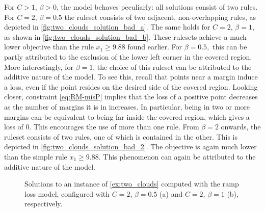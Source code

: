 \begin{example}
    For $C > 1$, $\beta > 0$, the model behaves peculiarly: all solutions consist of two rules.
    For $C=2$, $\beta = 0.5$ the ruleset consists of two adjacent, non-overlapping rules, as depicted in \autoref{fig:two_clouds_solution_bad_a}.
    The same holds for $C=2$, $\beta=1$, as shown in \autoref{fig:two_clouds_solution_bad_b}.
    These rulesets achieve a much lower objective than the rule $x_1 \geq 9.88$ found earlier.
    For $\beta=0.5,$ this can be partly attributed to the exclusion of the lower left corner in the covered region.
    More interestingly, for $\beta=1$, the choice of this ruleset can be attributed to the additive nature of the model.
    To see this, recall that points near a margin induce a loss, even if the point resides on the desired side of the covered region.
    Looking closer, constraint \eqref{eq:RM-misP} implies that the loss of a positive point decreases as the number of margins it is in increases.
    In particular, being in two or more margins can be equivalent to being far inside the covered region, which gives a loss of $0$.
    This encourages the use of more than one rule.
    From $\beta=2$ onwards, the ruleset consists of two rules, one of which is contained in the other.
    This is depicted in \autoref{fig:two_clouds_solution_bad_2}.
    The objective is again much lower than the simple rule $x_1 \geq 9.88$.
    This phenomenon can again be attributed to the additive nature of the model.

    \begin{figure}
        \centering
        \begin{subfigure}{.48\textwidth}
            \centering
            
            \caption{}
            \label{fig:two_clouds_solution_bad_a}
        \end{subfigure}
        \hfill
        \begin{subfigure}{.48\textwidth}
            \centering
            
            \caption{}
            \label{fig:two_clouds_solution_bad_b}
        \end{subfigure}
        \caption{Solutions to an instance of \autoref{ex:two_clouds} computed with the ramp loss model, configured with $C=2$, $\beta=0.5$ (a) and $C=2$, $\beta=1$ (b), respectively.}
        \label{fig:two_clouds_solution_bad}
    \end{figure}


\end{example}
